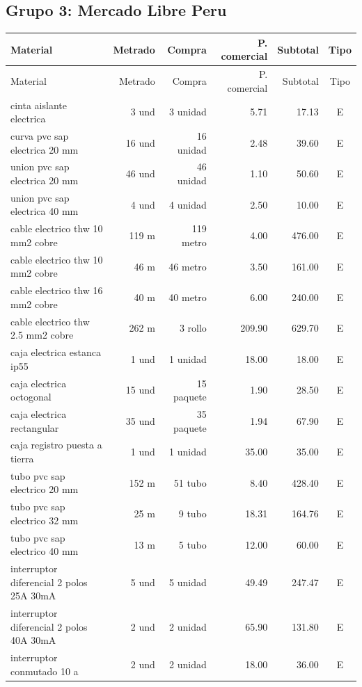 \subsection{Grupo 3: Mercado Libre Peru}
\begin{landscape}\scriptsize
\begin{longtable}{p{8.0cm}r r r r c}
\toprule Material & Metrado & Compra & P. comercial & Subtotal & Tipo \\ \midrule
\endfirsthead\toprule Material & Metrado & Compra & P. comercial & Subtotal & Tipo \\ \midrule\endhead
cinta aislante electrica & 3 und & 3 unidad & 5.71 & 17.13 & E \\
curva pvc sap electrica 20 mm & 16 und & 16 unidad & 2.48 & 39.60 & E \\
union pvc sap electrica 20 mm & 46 und & 46 unidad & 1.10 & 50.60 & E \\
union pvc sap electrica 40 mm & 4 und & 4 unidad & 2.50 & 10.00 & E \\
cable electrico thw 10 mm2 cobre & 119 m & 119 metro & 4.00 & 476.00 & E \\
cable electrico thw 10 mm2 cobre & 46 m & 46 metro & 3.50 & 161.00 & E \\
cable electrico thw 16 mm2 cobre & 40 m & 40 metro & 6.00 & 240.00 & E \\
cable electrico thw 2.5 mm2 cobre & 262 m & 3 rollo & 209.90 & 629.70 & E \\
caja electrica estanca ip55 & 1 und & 1 unidad & 18.00 & 18.00 & E \\
caja electrica octogonal & 15 und & 15 paquete & 1.90 & 28.50 & E \\
caja electrica rectangular & 35 und & 35 paquete & 1.94 & 67.90 & E \\
caja registro puesta a tierra & 1 und & 1 unidad & 35.00 & 35.00 & E \\
tubo pvc sap electrico 20 mm & 152 m & 51 tubo & 8.40 & 428.40 & E \\
tubo pvc sap electrico 32 mm & 25 m & 9 tubo & 18.31 & 164.76 & E \\
tubo pvc sap electrico 40 mm & 13 m & 5 tubo & 12.00 & 60.00 & E \\
interruptor diferencial 2 polos 25A 30mA & 5 und & 5 unidad & 49.49 & 247.47 & E \\
interruptor diferencial 2 polos 40A 30mA & 2 und & 2 unidad & 65.90 & 131.80 & E \\
interruptor conmutado 10 a & 2 und & 2 unidad & 18.00 & 36.00 & E \\

\end{longtable}
\end{landscape}
